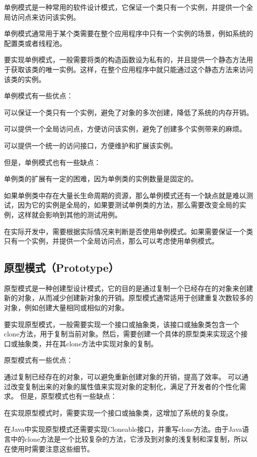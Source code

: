 \documentclass[cn,black,12pt,normal]{elegantnote}
\begin{document}
单例模式是一种常用的软件设计模式，它保证一个类只有一个实例，并提供一个全局访问点来访问该实例。

单例模式通常用于某个类需要在整个应用程序中只有一个实例的场景，例如系统的配置类或者线程池。

要实现单例模式，一般需要将类的构造函数设为私有的，并且提供一个静态方法用于获取该类的唯一实例。这样，在整个应用程序中就只能通过这个静态方法来访问该类的实例。

单例模式有一些优点：

可以保证一个类只有一个实例，避免了对象的多次创建，降低了系统的内存开销。

可以提供一个全局访问点，方便访问该实例，避免了创建多个实例带来的麻烦。

可以提供一个统一的访问接口，方便维护和扩展该实例。

但是，单例模式也有一些缺点：

单例类的扩展有一定的困难，因为单例类的实例数量是固定的。

如果单例类中存在大量长生命周期的资源，那么单例模式还有一个缺点就是难以测试，因为它的实例是全局的，如果要测试单例类的方法，那么需要改变全局的实例，这样就会影响到其他的测试用例。

在实际开发中，需要根据实际情况来判断是否使用单例模式。如果需要保证一个类只有一个实例，并提供一个全局访问点，那么可以考虑使用单例模式。



\subsection{原型模式（Prototype）}

原型模式是一种创建型设计模式，它的目的是通过复制一个已经存在的对象来创建新的对象，从而减少创建新对象的开销。原型模式通常适用于创建重复次数较多的对象，例如创建大量相同或相似的对象。

要实现原型模式，一般需要实现一个接口或抽象类，该接口或抽象类包含一个clone方法，用于复制当前对象。然后，需要创建一个具体的原型类来实现这个接口或抽象类，并在其clone方法中实现对象的复制。

原型模式有一些优点：

通过复制已经存在的对象，可以避免重新创建对象的开销，提高了效率。
可以通过改变复制出来的对象的属性值来实现对象的定制化，满足了开发者的个性化需求。
但是，原型模式也有一些缺点：

在实现原型模式时，需要实现一个接口或抽象类，这增加了系统的复杂度。

在Java中实现原型模式还需要实现Cloneable接口，并重写clone方法。由于Java语言中的clone方法是一个比较复杂的方法，它涉及到对象的浅复制和深复制，所以在使用时需要注意这些细节。
\end{document}
